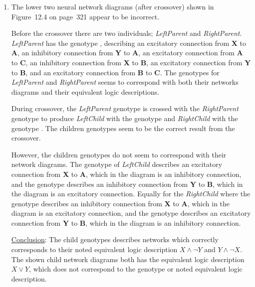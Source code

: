 \begin{enumerate}
\item {\color{WildStrawberry} The lower two neural network diagrams (after crossover) shown in Figure~12.4 on page~321 appear to be incorrect.}

Before the crossover there are two individuals; \textit{LeftParent} and \textit{RightParent}. \textit{LeftParent} has the genotype , describing an excitatory connection from \textbf{X} to \textbf{A}, an inhibitory connection from \textbf{Y} to \textbf{A}, an excitatory connection from \textbf{A} to \textbf{C}, an inhibitory connection from \textbf{X} to \textbf{B}, an excitatory connection from \textbf{Y} to \textbf{B}, and an excitatory connection from \textbf{B} to \textbf{C}. {\color{ForestGreen} The genotypes for \textit{LeftParent} and \textit{RightParent} seems to correspond with both their networks diagrams and their equivalent logic descriptions.}

During crossover, the \textit{LeftParent} genotype  is crossed with the \textit{RightParent} genotype  to produce \textit{LeftChild} with the genotype  and \textit{RightChild} with the genotype . {\color{ForestGreen} The children genotypes seem to be the correct result from the crossover.}

However, the children genotypes do not seem to correspond with their network diagrams. The genotype of \textit{LeftChild} describes an excitatory connection from \textbf{X} to \textbf{A}, which in the diagram is an inhibitory connection, and the genotype describes an inhibitory connection from \textbf{Y} to \textbf{B}, which in the diagram is an excitatory connection. Equally for the \textit{RightChild} where the genotype describes an inhibitory connection from \textbf{X} to \textbf{A}, which in the diagram is an excitatory connection, and the genotype describes an excitatory connection from \textbf{Y} to \textbf{B}, which in the diagram is an inhibitory connection.

\underline{Conclusion}: {\color{ForestGreen} The child genotypes describes networks which correctly corresponds to their noted equivalent logic description $X \land \neg Y$ and $Y \land \neg X$.} {\color{WildStrawberry} The shown child network diagrams both has the equivalent logic description $X \lor Y$, which does not correspond to the genotype or noted equivalent logic description.}


\end{enumerate}

